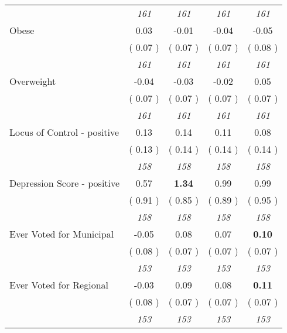 \begin{tabular}{l c c c c}
& \textit{ 161 } & \textit{ 161 } & \textit{ 161 } & \textit{ 161 } \\
Obese &      0.03 &     -0.01 &     -0.04 &     -0.05 \\
& (     0.07 ) & (     0.07 ) & (     0.07 ) & (     0.08 ) \\
& \textit{ 161 } & \textit{ 161 } & \textit{ 161 } & \textit{ 161 } \\
Overweight &     -0.04 &     -0.03 &     -0.02 &      0.05 \\
& (     0.07 ) & (     0.07 ) & (     0.07 ) & (     0.07 ) \\
& \textit{ 161 } & \textit{ 161 } & \textit{ 161 } & \textit{ 161 } \\
Locus of Control - positive &      0.13 &      0.14 &      0.11 &      0.08 \\
& (     0.13 ) & (     0.14 ) & (     0.14 ) & (     0.14 ) \\
& \textit{ 158 } & \textit{ 158 } & \textit{ 158 } & \textit{ 158 } \\
Depression Score - positive &      0.57 & \textbf{      1.34 } &      0.99 &      0.99 \\
& (     0.91 ) & (     0.85 ) & (     0.89 ) & (     0.95 ) \\
& \textit{ 158 } & \textit{ 158 } & \textit{ 158 } & \textit{ 158 } \\
Ever Voted for Municipal &     -0.05 &      0.08 &      0.07 & \textbf{     0.10} \\
& (     0.08 ) & (     0.07 ) & (     0.07 ) & (     0.07 ) \\
& \textit{ 153 } & \textit{ 153 } & \textit{ 153 } & \textit{ 153 } \\
Ever Voted for Regional &     -0.03 &      0.09 &      0.08 & \textbf{     0.11} \\
& (     0.08 ) & (     0.07 ) & (     0.07 ) & (     0.07 ) \\
& \textit{ 153 } & \textit{ 153 } & \textit{ 153 } & \textit{ 153 } \\
\bottomrule
\end{tabular}
